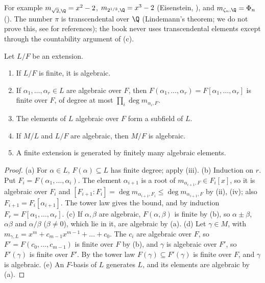For example $m_{\sqrt2,\Q}=x^2-2$, $m_{2^{1/3},\Q}=x^3-2$ (Eisenstein, ), and $m_{\zeta_n,\Q}=\Phi_n$ (). The
number $\pi$ is transcendental over $\Q$ (Lindemann's theorem; we do not prove this, see \cite[Chapter 1]{MilneFields} for references); the book never uses
transcendental elements except through the countability argument of (c).

\begin{proposition}\label{prop:galois:algebraic-extensions}
Let $L/F$ be an extension.
\begin{enumerate}[label=(\alph*)]
\item If $L/F$ is finite, it is algebraic.
\item If $\alpha_1,\dots,\alpha_r\in L$ are algebraic over $F$, then $F(\alpha_1,\dots,\alpha_r)=F[\alpha_1,\dots,\alpha_r]$ is finite over $F$, of degree at most
$\prod_i\deg m_{\alpha_i,F}$.
\item The elements of $L$ algebraic over $F$ form a subfield of $L$.
\item If $M/L$ and $L/F$ are algebraic, then $M/F$ is algebraic.
\item A finite extension is generated by finitely many algebraic elements.
\end{enumerate}
\end{proposition}

\begin{proof}
(a) For $\alpha\in L$, $F(\alpha)\subseteq L$ has finite degree; apply (iii).
(b) Induction on $r$. Put $F_{i}=F(\alpha_1,\dots,\alpha_i)$. The element $\alpha_{i+1}$ is a root of $m_{\alpha_{i+1},F}\in F_i[x]$, so it is algebraic over $F_i$
and $[F_{i+1}:F_i]=\deg m_{\alpha_{i+1},F_i}\le\deg m_{\alpha_{i+1},F}$ by (ii), (iv); also $F_{i+1}=F_i[\alpha_{i+1}]$. The tower
law gives the bound, and by induction $F_r=F[\alpha_1,\dots,\alpha_r]$.
(c) If $\alpha,\beta$ are algebraic, $F(\alpha,\beta)$ is finite by (b), so $\alpha\pm\beta$, $\alpha\beta$ and $\alpha/\beta$ ($\beta\ne0$), which lie in it,
are algebraic by (a).
(d) Let $\gamma\in M$, with $m_{\gamma,L}=x^m+c_{m-1}x^{m-1}+\dots+c_0$. The $c_i$ are algebraic over $F$, so $F'=F(c_0,\dots,c_{m-1})$ is finite over $F$ by (b), and
$\gamma$ is algebraic over $F'$, so $F'(\gamma)$ is finite over $F'$. By the tower law $F(\gamma)\subseteq F'(\gamma)$ is finite over $F$, and $\gamma$ is algebraic.
(e) An $F$-basis of $L$ generates $L$, and its elements are algebraic by (a).
\end{proof}


